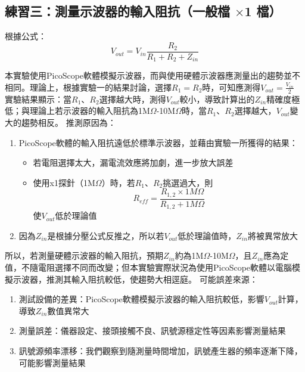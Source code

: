 \documentclass[12pt,a4paper]{article}
\begin{document}
\begin{CJK}{UTF8}{bkai}
\subsection{練習三：測量示波器的輸入阻抗（一般檔 $\times$1 檔）}
\hfill

根據公式：
\begin{equation*}
    V_{out}=V_{in}\frac{R_2}{R_1+R_2+Z_{in}}
\end{equation*}

本實驗使用PicoScope軟體模擬示波器，而與使用硬體示波器應測量出的趨勢並不相同。理論上，根據實驗一的結果討論，選擇$R_1=R_2$時，可知應測得$V_{out}=\frac{V_{in}}{2}$
實驗結果顯示：當$R_1$、$R_2$選擇越大時，測得$V_{out}$較小，導致計算出的$Z_{in}$精確度極低；與理論上若示波器的輸入阻抗為1M$\Omega$-10M$\Omega$時，當$R_1$、$R_2$選擇越大，$V_{out}$變大的趨勢相反。
推測原因為：
\begin{enumerate}
    \item PicoScope軟體的輸入阻抗遠低於標準示波器，並藉由實驗一所獲得的結果：
    \begin{itemize}
        \item 若電阻選擇太大，漏電流效應將加劇，進一步放大誤差
        \item 使用x1探針（1M$\Omega$）時，若$R_1$、$R_2$挑選過大，則
        \begin{equation*}
            R_{eff}=\frac{R_{1,2}\times1M\Omega}{R_{1,2}+1M\Omega}
        \end{equation*}
        使$V_{out}$低於理論值
    \end{itemize}
    \item 因為$Z_{in}$是根據分壓公式反推之，所以若$V_{out}$低於理論值時，$Z_{in}$將被異常放大
\end{enumerate}

\clearpage

所以，若測量硬體示波器的輸入阻抗，預期$Z_{in}$約為1M$\Omega$-10M$\Omega$，且$Z_{in}$應為定值，不隨電阻選擇不同而改變；但本實驗實際狀況為使用PicoScope軟體以電腦模擬示波器，推測其輸入阻抗較低，使趨勢大相逕庭。
可能誤差來源：
\begin{enumerate}
    \item 測試設備的差異：PicoScope軟體模擬示波器的輸入阻抗較低，影響$V_{out}$計算，導致$Z_{in}$數值異常大
    \item 測量誤差：儀器設定、接頭接觸不良、訊號源穩定性等因素影響測量結果
    \item 訊號源頻率漂移：我們觀察到隨測量時間增加，訊號產生器的頻率逐漸下降，可能影響測量結果
\end{enumerate}


\end{CJK}
\end{document}
